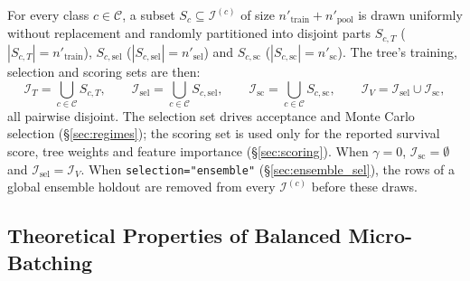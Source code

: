 \documentclass[11pt,a4paper]{article}
\newcommand{\code}[1]{\texttt{#1}}
\begin{document}
For every class $c \in \mathcal{C}$, a subset $S_c \subseteq \mathcal{I}^{(c)}$ of size $n'_{\text{train}} + n'_{\text{pool}}$ is drawn uniformly without replacement and randomly partitioned into disjoint parts $S_{c,T}$ ($|S_{c,T}| = n'_{\text{train}}$), $S_{c,\text{sel}}$ ($|S_{c,\text{sel}}| = n'_{\text{sel}}$) and $S_{c,\text{sc}}$ ($|S_{c,\text{sc}}| = n'_{\text{sc}}$). The tree's training, selection and scoring sets are then:
\begin{equation}
  \mathcal{I}_{T} = \bigcup_{c \in \mathcal{C}} S_{c,T},
  \qquad
  \mathcal{I}_{\text{sel}} = \bigcup_{c \in \mathcal{C}} S_{c,\text{sel}},
  \qquad
  \mathcal{I}_{\text{sc}} = \bigcup_{c \in \mathcal{C}} S_{c,\text{sc}},
  \qquad
  \mathcal{I}_{V} = \mathcal{I}_{\text{sel}} \cup \mathcal{I}_{\text{sc}},
\end{equation}
all pairwise disjoint. The selection set drives acceptance and Monte Carlo selection (\S\ref{sec:regimes}); the scoring set is used only for the reported survival score, tree weights and feature importance (\S\ref{sec:scoring}). When $\gamma = 0$, $\mathcal{I}_{\text{sc}} = \emptyset$ and $\mathcal{I}_{\text{sel}} = \mathcal{I}_V$. When \code{selection="ensemble"} (\S\ref{sec:ensemble_sel}), the rows of a global ensemble holdout are removed from every $\mathcal{I}^{(c)}$ before these draws.

\subsection*{Theoretical Properties of Balanced Micro-Batching}
\end{document}
